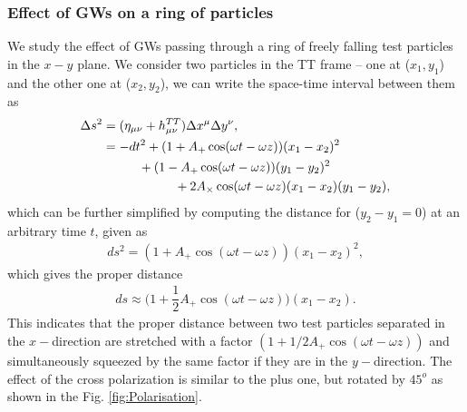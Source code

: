 \subsubsection{Effect of GWs on a ring of particles}\label{sec:gw-effect-ring}
We study the effect of GWs passing through a ring of freely falling test particles in the $x-y$ plane. We consider two particles in the TT frame -- one at ($x_1, y_1$) and the other one at ($x_2, y_2$), we can write the space-time interval between them as
\begin{align}
    \Delta s^2 &= (\eta_{\mu\nu} + h^{TT}_{\mu\nu})\Delta x^{\mu} \Delta y^{\nu}, \\
    & = -dt^2 + (1 + A_{+}\cos(\omega t -\omega z ))(x_1 - x_2)^2  \notag \\
    & \hspace{1cm} + (1 - A_{+}\cos(\omega t -\omega z))(y_1-y_2)^2 \notag \\ 
    & \hspace{2cm} + 2A_{\times}\cos(\omega t -\omega z)(x_1-x_2)(y_1-y_2),
\end{align}
which can be further simplified by computing the distance for ($y_2 - y_1 = 0$) at an arbitrary time $t$, given as
\begin{align}
    ds^2 = (1 + A_+\cos(\omega t -\omega z))(x_1 - x_2)^2,
\end{align}
which gives the proper distance
\begin{align}
    ds \approx \Big( 1 + \dfrac{1}{2}A_{+}\cos(\omega t -\omega z) \Big)(x_1 - x_2). \label{Eq:ring-eqn}
\end{align}
This indicates that the proper distance between two test particles separated in the $x-$direction are stretched with a factor $(1+ 1/2A_+\cos(\omega t -\omega z))$ and simultaneously squeezed by the same factor if they are in the $y-$direction. The effect of the cross polarization is similar to the plus one, but rotated by $45^{o}$ as shown in the Fig. \ref{fig:Polarisation}. 

